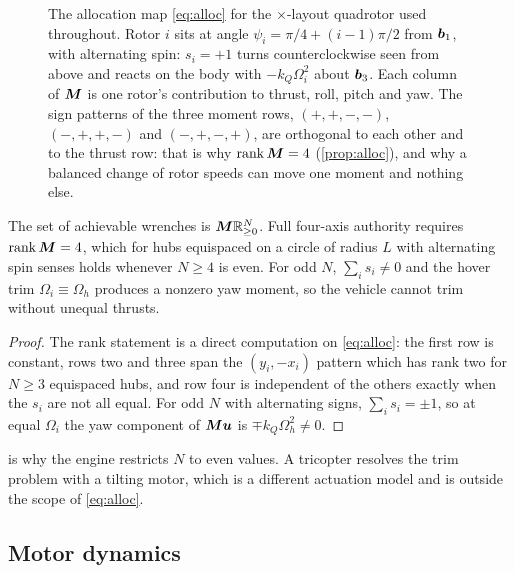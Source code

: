 \begin{figure}[tbp]
\centering

\caption{The allocation map \cref{eq:alloc} for the $\times$-layout quadrotor
used throughout. Rotor $i$ sits at angle $\psi_i=\pi/4+(i-1)\pi/2$ from
$\bm{b}_1$, with alternating spin: $s_i=+1$ turns counterclockwise seen from
above and reacts on the body with $-k_Q\Omega_i^2$ about $\bm{b}_3$. Each
column of $\bm{M}$ is one rotor's contribution to thrust, roll, pitch and yaw.
The sign patterns of the three moment rows, $(+,+,-,-)$, $(-,+,+,-)$ and
$(-,+,-,+)$, are orthogonal to each other and to the thrust row: that is why
$\operatorname{rank}\bm{M}=4$ (\cref{prop:alloc}), and why a balanced change of rotor speeds
can move one moment and nothing else.}
\label{fig:allocation}
\end{figure}

\begin{proposition}
\label{prop:alloc}
The set of achievable wrenches is $\bm{M}\mathbb{R}_{\ge0}^N$. Full four-axis
authority requires $\operatorname{rank} \bm{M} = 4$, which for hubs equispaced on a circle of
radius $L$ with alternating spin senses holds whenever $N\ge4$ is even. For odd
$N$, $\sum_i s_i\ne0$ and the hover trim $\Omega_i\equiv\Omega_h$ produces a
nonzero yaw moment, so the vehicle cannot trim without unequal thrusts.
\end{proposition}

\begin{proof}
The rank statement is a direct computation on \cref{eq:alloc}: the first row is
constant, rows two and three span the $(y_i,-x_i)$ pattern which has rank two
for $N\ge3$ equispaced hubs, and row four is independent of the others exactly
when the $s_i$ are not all equal. For odd $N$ with alternating signs,
$\sum_i s_i = \pm1$, so at equal $\Omega_i$ the yaw component of
$\bm{M}\bm{u}$ is $\mp k_Q\Omega_h^2 \ne 0$.
\end{proof}

\begin{remark}
 is why the engine restricts $N$ to even values. A tricopter
resolves the trim problem with a tilting motor, which is a different actuation
model and is outside the scope of \cref{eq:alloc}.
\end{remark}

\subsection{Motor dynamics}

